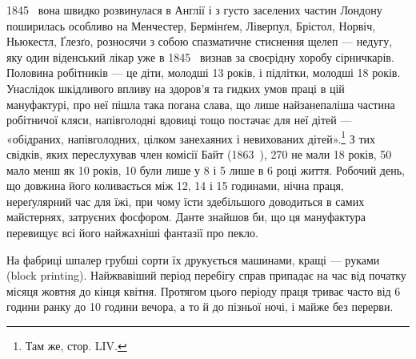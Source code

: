 \parcont{}  %
1845~ вона швидко розвинулася в Англії і з густо заселених
частин Лондону поширилась особливо на Менчестер, Бермінґем,
Ліверпул, Брістол, Норвіч, Ньюкестл, Ґлезґо, розносячи з
собою спазматичне стиснення щелеп — недугу, яку один віденський
лікар уже в 1845~ визнав за своєрідну хоробу сірничкарів.
Половина робітників — це діти, молодші 13 років, і
підлітки, молодші 18 років. Унаслідок шкідливого впливу на
здоров’я та гидких умов праці в цій мануфактурі, про неї пішла
така погана слава, що лише найзанепаліша частина робітничої
кляси, напівголодні вдовиці тощо постачає для неї дітей — «обідраних,
напівголодних, цілком занехаяних і невихованих дітей».\footnote{
Там же, стор. LIV.
}
З тих свідків, яких переслухував член комісії Байт (1863~),
270 не мали 18 років, 50 мало менш як 10 років, 10 були лише
у 8 і 5 лише в 6 році життя. Робочий день, що довжина його коливається
між 12, 14 і 15 годинами, нічна праця, нереґулярний
час для їжі, при чому їсти здебільшого доводиться в самих майстернях,
затруєних фосфором. Данте знайшов би, що ця мануфактура
перевищує всі його найжахніші фантазії про пекло.

На фабриці шпалер грубші сорти їх друкується машинами,
кращі — руками (block printing). Найжвавіший період перебігу
справ припадає на час від початку місяця жовтня до кінця
квітня. Протягом цього періоду праця триває часто від 6 години
ранку до 10 години вечора, а то й до пізньої ночі, і майже без
перерви.

